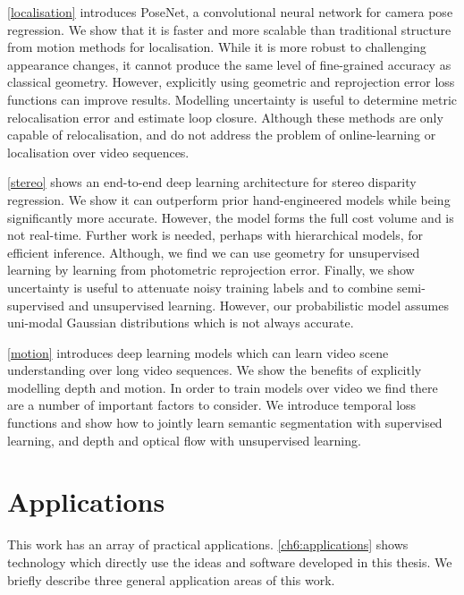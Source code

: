 \cref{localisation} introduces PoseNet, a convolutional neural network for camera pose regression. We show that it is faster and more scalable than traditional structure from motion methods for localisation. While it is more robust to challenging appearance changes, it cannot produce the same level of fine-grained accuracy as classical geometry. However, explicitly using geometric and reprojection error loss functions can improve results. Modelling uncertainty is useful to determine metric relocalisation error and estimate loop closure. Although these methods are only capable of relocalisation, and do not address the problem of online-learning or localisation over video sequences.

\cref{stereo} shows an end-to-end deep learning architecture for stereo disparity regression. We show it can outperform prior hand-engineered models while being significantly more accurate. However, the model forms the full cost volume and is not real-time. Further work is needed, perhaps with hierarchical models, for efficient inference. Although, we find we can use geometry for unsupervised learning by learning from photometric reprojection error. Finally, we show uncertainty is useful to attenuate noisy training labels and to combine semi-supervised and unsupervised learning. However, our probabilistic model assumes uni-modal Gaussian distributions which is not always accurate.

\cref{motion} introduces deep learning models which can learn video scene understanding over long video sequences. We show the benefits of explicitly modelling depth and motion. In order to train models over video we find there are a number of important factors to consider. We introduce temporal loss functions and show how to jointly learn semantic segmentation with supervised learning, and depth and optical flow with unsupervised learning.

\section{Applications}

This work has an array of practical applications. \cref{ch6:applications} shows technology which directly use the ideas and software developed in this thesis. We briefly describe three general application areas of this work.

